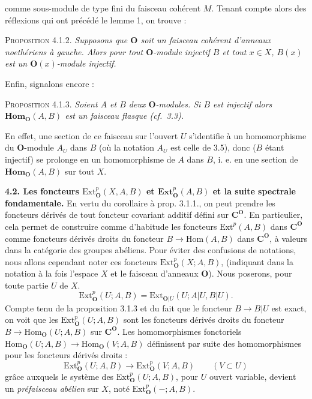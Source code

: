 \clearpage
{}

\noindent comme sous-module de type fini du faisceau cohérent $M$. Tenant
compte alors des réflexions qui ont précédé le lemme 1, on trouve :

\textsc{Proposition 4.1.2.} \textit{Supposons que ${\mathbf O}$ soit un faisceau
cohérent d'anneaux noethériens à gauche. Alors pour tout ${\mathbf O}$-module injectif
$B$ et tout $x\in X$, $B(x)$ est un ${\mathbf O}(x)$-module injectif.}

Enfin, signalons encore :

\textsc{Proposition 4.1.3.} \textit{Soient $A$ et $B$ deux
${\mathbf O}$-modules. Si $B$ est injectif alors $\mathbf{Hom}_{\mathbf O}(A,B)$ est un faisceau
flasque \textup{(}cf.\ \textup{3.3)}.}

En effet, une section de ce faisceau sur l'ouvert $U$ s'identifie à un
homomorphisme du ${\mathbf O}$-module $A_U$ dans $B$ (où la notation $A_U$ est celle de
3.5), donc ($B$ étant injectif) se prolonge en un homomorphisme de $A$ dans
$B$, i. e. en une section de $\mathbf{Hom}_{\mathbf O}(A,B)$ sur tout $X$.

\textbf{4.2. Les foncteurs $\mathrm{Ext}_{\mathbf O}^p(X,A,B)$ et
$\mathbf{Ext}_{\mathbf O}^p(A,B)$ et la suite spectrale fondamentale.}
En vertu du corollaire à prop. 3.1.1., on peut prendre les foncteurs dérivés
de tout foncteur covariant additif défini sur $\mathbf C^{\mathbf O}$. En particulier, cela
permet de construire comme d'habitude les foncteurs $\mathrm{Ext}^p(A,B)$
dans $\mathbf C^{\mathbf O}$ comme foncteurs dérivés droits du foncteur
$B\to\mathrm{Hom}(A,B)$ dans $\mathbf C^{\mathbf O}$, à valeurs dans la catégorie des
groupes abéliens. Pour éviter des confusions de notations, nous allons
cependant noter ces foncteurs $\mathrm{Ext}_{\mathbf O}^p(X;A,B)$, (indiquant dans la
notation à la fois l'espace $X$ et le faisceau d'anneaux ${\mathbf O}$). Nous poserons,
pour toute partie $U$ de $X$.
\[
\tag{4.2.1}
\mathrm{Ext}_{\mathbf O}^p(U;A,B)=
\mathrm{Ext}_{{\mathbf O}|U}(U;A|U,B|U).
\]
Compte tenu de la proposition 3.1.3 et du fait que le foncteur
$B\to B|U$ est exact, on voit que les $\mathrm{Ext}_{\mathbf O}^p(U;A,B)$ sont
les foncteurs dérivés droits du foncteur
$B\to\mathrm{Hom}_{\mathbf O}(U;A,B)$ sur $\mathbf C^{\mathbf O}$. Les homomorphismes fonctoriels
$\mathrm{Hom}_{\mathbf O}(U;A,B)\to\mathrm{Hom}_{\mathbf O}(V;A,B)$ définissent par
suite des homomorphismes pour les foncteurs dérivés droits :
\[
\tag{4.2.2}
\mathrm{Ext}_{\mathbf O}^p(U;A,B)\to\mathrm{Ext}_{\mathbf O}^p(V;A,B)
\qquad(V\subset U)
\]
grâce auxquels le système des $\mathrm{Ext}_{\mathbf O}^p(U;A,B)$, pour $U$ ouvert
variable, devient un \textit{préfaisceau abélien} sur $X$, noté
$\mathrm{Ext}_{\mathbf O}^p(-;A,B)$.

